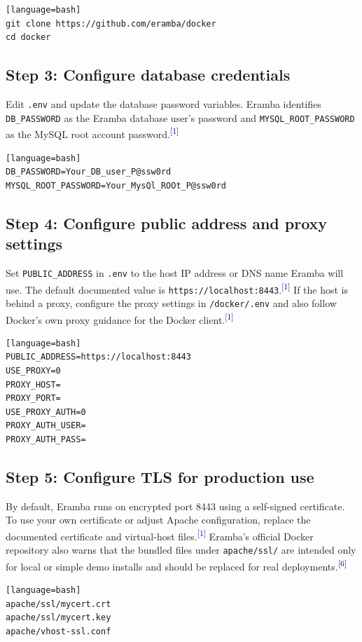\documentclass[10pt,letterpaper]{article}
\newcommand{\source}[1]{\textsuperscript{\textcolor{navy}{#1}}}
\begin{document}
\begin{verbatim}[language=bash]
git clone https://github.com/eramba/docker
cd docker
\end{verbatim}

\subsection{Step 3: Configure database credentials}
Edit \texttt{.env} and update the database password variables. Eramba identifies \texttt{DB\_PASSWORD} as the Eramba database user's password and \texttt{MYSQL\_ROOT\_PASSWORD} as the MySQL root account password.\source{[1]}

\begin{verbatim}[language=bash]
DB_PASSWORD=Your_DB_user_P@ssw0rd
MYSQL_ROOT_PASSWORD=Your_MysQl_ROOt_P@ssw0rd
\end{verbatim}

\subsection{Step 4: Configure public address and proxy settings}
Set \texttt{PUBLIC\_ADDRESS} in \texttt{.env} to the host IP address or DNS name Eramba will use. The default documented value is \texttt{https://localhost:8443}.\source{[1]} If the host is behind a proxy, configure the proxy settings in \texttt{/docker/.env} and also follow Docker's own proxy guidance for the Docker client.\source{[1]}

\begin{verbatim}[language=bash]
PUBLIC_ADDRESS=https://localhost:8443
USE_PROXY=0
PROXY_HOST=
PROXY_PORT=
USE_PROXY_AUTH=0
PROXY_AUTH_USER=
PROXY_AUTH_PASS=
\end{verbatim}

\subsection{Step 5: Configure TLS for production use}
By default, Eramba runs on encrypted port 8443 using a self-signed certificate. To use your own certificate or adjust Apache configuration, replace the documented certificate and virtual-host files.\source{[1]} Eramba's official Docker repository also warns that the bundled files under \texttt{apache/ssl/} are intended only for local or simple demo installs and should be replaced for real deployments.\source{[6]}

\begin{verbatim}[language=bash]
apache/ssl/mycert.crt
apache/ssl/mycert.key
apache/vhost-ssl.conf
\end{verbatim}
\end{document}
